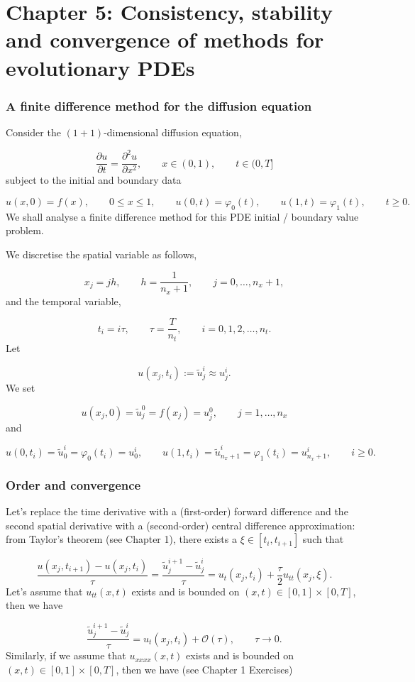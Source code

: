 \documentclass[12pt,landscape]{article}
\begin{document}
{\Huge
\sf
\section{Chapter 5: Consistency, stability and convergence of methods for evolutionary PDEs}
\subsubsection{A finite difference method for the diffusion equation}
Consider the $(1+1)$-dimensional diffusion equation,

\[
\frac{\partial u}{\partial t}=\frac{\partial^2 u}{\partial x^2}, \qquad x \in (0, 1),\qquad t \in (0, T]
\]
subject to the initial and boundary data

\[
u(x,0) = f(x), \qquad 0 \leq x \leq 1, \qquad u(0,t) = \varphi_0(t), \qquad u(1,t) = \varphi_1(t), \qquad t \geq 0.
\]
We shall analyse a finite difference method for this PDE initial / boundary value problem.

We discretise the spatial variable as follows,

\[
x_j = j h, \qquad h = \frac{1}{n_x + 1}, \qquad j = 0, \ldots, n_x + 1,
\]
and the temporal variable,

\[
t_i = i\tau, \qquad \tau = \frac{T}{n_t}, \qquad i = 0, 1, 2, \ldots, n_t.
\]
Let 

\[
u(x_j, t_i) := \tilde{u}^i_j \approx u^{i}_j.
\]
We set

\[
u(x_j, 0) = \tilde{u}^0_j =  f(x_j) =  u^{0}_j, \qquad j = 1, \ldots, n_x
\]
and

\[
u(0,t_i)  = \tilde{u}^i_0 = \varphi_0(t_i) =  u^i_0, \qquad u(1,t_i) =  \tilde{u}^i_{n_x + 1} = \varphi_1(t_i) =  u^i_{n_x +1}, \qquad i \geq 0.
\]
\subsubsection{Order and convergence}
Let's replace the time derivative with a (first-order) forward difference and the second spatial derivative with a (second-order) central difference approximation: from Taylor's theorem (see Chapter 1), there exists a $\xi \in [t_i, t_{i+1}]$ such that

\[
\frac{u(x_j,t_{i+1}) - u(x_j,t_{i})}{\tau} =\frac{\tilde{u}^{i+1}_j - \tilde{u}^i_j}{\tau} = u_t(x_j,t_i) + \frac{\tau}{2}u_{tt}(x_j,\xi).
\]
Let's assume that $u_{tt}(x,t)$ exists and is bounded on $(x,t) \in [0,1]\times[0,T]$, then we have

\[
\frac{\tilde{u}^{i+1}_j - \tilde{u}^i_j}{\tau} = u_t(x_j,t_i) + \mathcal{O}(\tau), \qquad \tau \to 0.
\]
Similarly, if we assume that $u_{xxxx}(x,t)$ exists and is bounded on $(x,t) \in [0,1]\times[0,T]$, then we have (see Chapter 1 Exercises)

}
\end{document}
